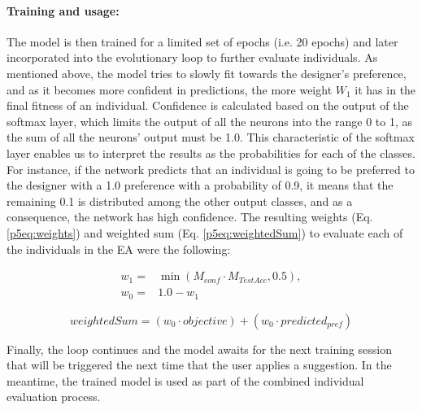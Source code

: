 \paragraph{Training and usage:}

The model is then trained for a limited set of epochs (i.e. 20 epochs) and later incorporated into the evolutionary loop to further evaluate individuals. As mentioned above, the model tries to slowly fit towards the designer’s preference, and as it becomes more confident in predictions, the more weight $W_{1}$ it has in the final fitness of an individual. Confidence is calculated based on the output of the softmax layer, which %
limits the output of all the neurons into the range 0 to 1, as the sum of all the neurons' output must be 1.0. This characteristic of the softmax layer enables us to interpret the results as the probabilities for each of the classes. For instance, if the network predicts that an individual is going to be preferred to the designer with a 1.0 preference with a probability of 0.9, it means that the remaining 0.1 is distributed among the other output classes, and as a consequence, the network has high confidence. The resulting weights (Eq. \ref{p5eq:weights}) and weighted sum (Eq. \ref{p5eq:weightedSum}) to evaluate each of the individuals in the EA were the following:



\begin{equation} \label{p5eq:weights}
\begin{split}
 w_{1}={}&\min(M_{conf} \cdot M_{TestAcc}, 0.5),\\
w_{0} ={}& 1.0 - w_{1}   
\end{split}
\end{equation}


\begin{equation} \label{p5eq:weightedSum}
weightedSum = (w_{0} \cdot objective) + (w_{0} \cdot predicted_{pref})
\end{equation}

Finally, the loop continues and the model awaits for the next training session that will be triggered the next time that the user applies a suggestion. In the meantime, the trained model is used as part of the combined individual evaluation process.